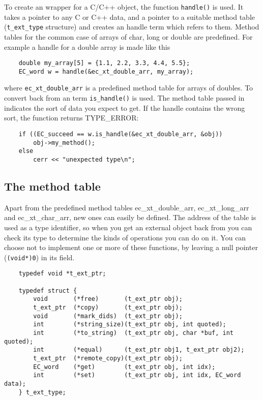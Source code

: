 To create an {\eclipse} wrapper for a C/C++ object,
the function \verb.handle(). is used. It takes a pointer to any C or C++
data, and a pointer to a suitable method table (\verb.t_ext_type. structure)
and creates an {\eclipse} handle term which refers to them.
Method tables for the common case of arrays of char, long or double
are predefined. For example a handle for a double array is made like this
\begin{verbatim}
    double my_array[5] = {1.1, 2.2, 3.3, 4.4, 5.5};
    EC_word w = handle(&ec_xt_double_arr, my_array);
\end{verbatim}
where \verb.ec_xt_double_arr. is a predefined method table for arrays of doubles.
To convert back from an {\eclipse} term \verb.is_handle(). is used.
The method table passed in indicates the sort of data you expect to get.
If the {\eclipse} handle contains the wrong sort, the function returns
TYPE_ERROR:
\begin{verbatim}
    if ((EC_succeed == w.is_handle(&ec_xt_double_arr, &obj))
        obj->my_method();
    else
        cerr << "unexpected type\n";
\end{verbatim}


\subsection{The method table}
Apart from the predefined method tables ec_xt_double_arr,
ec_xt_long_arr and ec_xt_char_arr, new ones can easily be defined.
The address of the table is used as a type identifier, so when you
get an external object back from {\eclipse} you can check its type
to determine the kinds of operations you can do on it.
You can choose not to implement one or more of these functions, by
leaving a null pointer (\verb.(void*)0.) in its field.

\begin{verbatim}
    typedef void *t_ext_ptr;

    typedef struct {
        void       (*free)       (t_ext_ptr obj);
        t_ext_ptr  (*copy)       (t_ext_ptr obj);
        void       (*mark_dids)  (t_ext_ptr obj);
        int        (*string_size)(t_ext_ptr obj, int quoted);
        int        (*to_string)  (t_ext_ptr obj, char *buf, int quoted);
        int        (*equal)      (t_ext_ptr obj1, t_ext_ptr obj2);
        t_ext_ptr  (*remote_copy)(t_ext_ptr obj);
        EC_word    (*get)        (t_ext_ptr obj, int idx);
        int        (*set)        (t_ext_ptr obj, int idx, EC_word data);
    } t_ext_type;
\end{verbatim}

